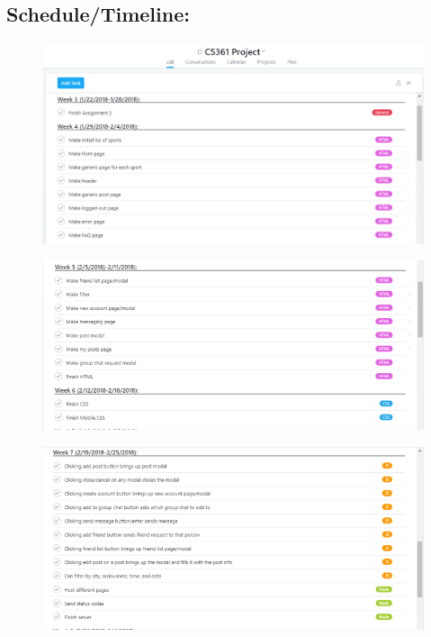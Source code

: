 \documentclass[a4paper]{article}
\begin{document}
\subsection{Schedule/Timeline:}
\begin{figure}[!ht]
  \centering
		\includegraphics[width=1\textwidth]{images/sched1.png}
    \label{fig:sched1}
\end{figure}
\begin{figure}[!ht]
  \centering
		\includegraphics[width=1\textwidth]{images/sched2.png}
    \label{fig:sched2}
\end{figure}
\begin{figure}[!ht]
  \centering
		\includegraphics[width=1\textwidth]{images/sched3.png}
    \label{fig:sched3}
\end{figure}
\end{document}
